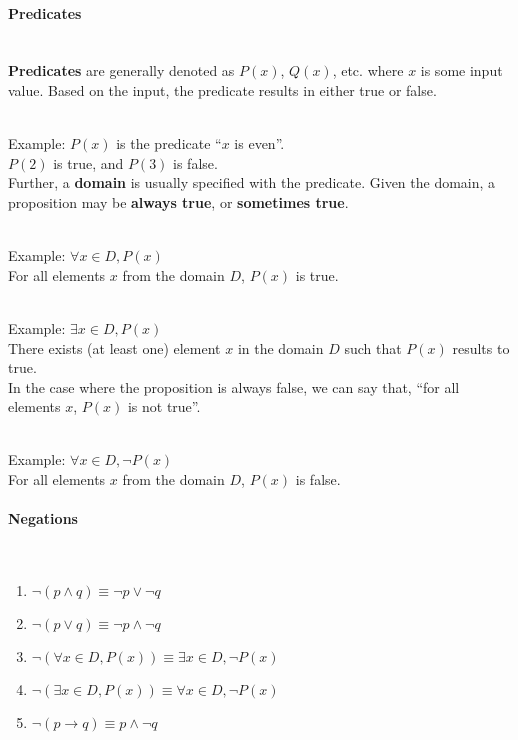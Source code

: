     \paragraph{Predicates} ~\\

        \textbf{Predicates} are generally denoted as $P(x)$, $Q(x)$, etc. where
        $x$ is some input value. Based on the input, the predicate results in either
        true or false.

        ~\\ Example: $P(x)$ is the predicate ``$x$ is even''. \\
        $P(2)$ is true, and $P(3)$ is false. ~\\

        Further, a \textbf{domain} is usually specified with the predicate.
        Given the domain, a proposition may be \textbf{always true}, or
        \textbf{sometimes true}.

        ~\\ Example: $\forall x \in D, P(x)$ \\ \tab For all elements $x$ from the domain $D$, $P(x)$ is true.
        
        ~\\ Example: $\exists x \in D, P(x)$ \\ \tab There exists (at least one) element $x$ in the domain $D$ such that $P(x)$ results to true.
        ~\\
        
        In the case where the proposition is
        always false, we can say that, ``for all elements $x$, $P(x)$ is not true''.

        ~\\ Example: $\forall x \in D, \neg P(x)$ \\ \tab For all elements $x$ from the domain $D$, $P(x)$ is false.

    \paragraph{Negations} ~\\

        \begin{enumerate}
            \item   $\neg (p \land q)   \equiv      \neg p \lor \neg q$
            \item   $\neg (p \lor q)    \equiv      \neg p \land \neg q$
            \item   $\neg (\forall x \in D, P(x))   \equiv      \exists x \in D, \neg P(x)$
            \item   $\neg (\exists x \in D, P(x))   \equiv      \forall x \in D, \neg P(x)$
            \item   $\neg (p \to q)     \equiv      p \land \neg q$
        \end{enumerate}


